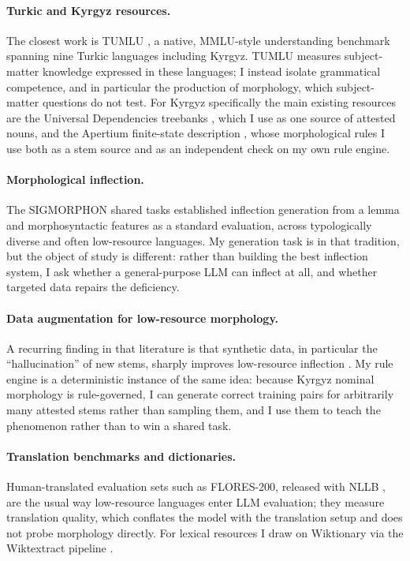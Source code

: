 \documentclass[11pt]{article}
\begin{document}
\paragraph{Turkic and Kyrgyz resources.}
The closest work is TUMLU \cite{tumlu2025}, a native, MMLU-style understanding
benchmark spanning nine Turkic languages including Kyrgyz. TUMLU measures
subject-matter knowledge expressed in these languages; I instead isolate grammatical
competence, and in particular the production of morphology, which subject-matter
questions do not test. For Kyrgyz specifically the main existing resources are the
Universal Dependencies treebanks \cite{nivre2020ud}, which I use as one source of
attested nouns, and the Apertium finite-state description
\cite{forcada2011apertium,khanna2021apertium}, whose morphological rules I use both
as a stem source and as an independent check on my own rule engine.

\paragraph{Morphological inflection.}
The SIGMORPHON shared tasks \cite{mccarthy2019sigmorphon,vylomova2020sigmorphon}
established inflection generation from a lemma and morphosyntactic features as a
standard evaluation, across typologically diverse and often low-resource languages.
My generation task is in that tradition, but the object of study is different: rather
than building the best inflection system, I ask whether a general-purpose LLM can
inflect at all, and whether targeted data repairs the deficiency.

\paragraph{Data augmentation for low-resource morphology.}
A recurring finding in that literature is that synthetic data, in particular the
``hallucination'' of new stems, sharply improves low-resource inflection
\cite{anastasopoulos2019inflection}. My rule engine is a deterministic instance of
the same idea: because Kyrgyz nominal morphology is rule-governed, I can generate
correct training pairs for arbitrarily many attested stems rather than sampling them,
and I use them to teach the phenomenon rather than to win a shared task.

\paragraph{Translation benchmarks and dictionaries.}
Human-translated evaluation sets such as FLORES-200, released with NLLB
\cite{nllb2022}, are the usual way low-resource languages enter LLM evaluation; they
measure translation quality, which conflates the model with the translation setup and
does not probe morphology directly. For lexical resources I draw on Wiktionary via
the Wiktextract pipeline \cite{ylonen2022wiktextract}.
\end{document}
